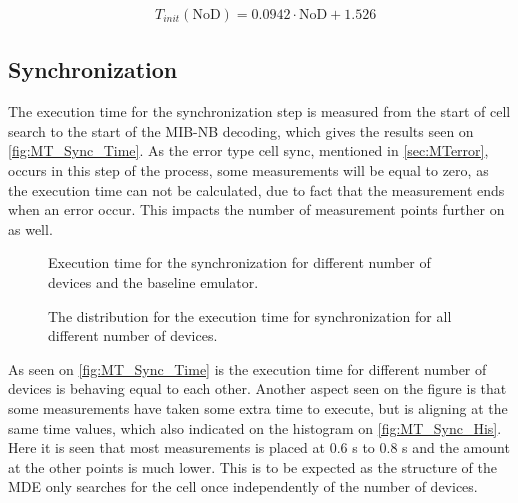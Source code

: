 \begin{align}
&T_{init} (\text{NoD}) = 0.0942 \cdot \text{NoD} + 1.526 
\end{align}
\begin{where}
\end{where}


\subsection{Synchronization}
The execution time for the synchronization step is measured from the start of cell search to the start of the MIB-NB decoding, which gives the results seen on \autoref{fig:MT_Sync_Time}. As the error type cell sync, mentioned in \autoref{sec:MTerror}, occurs in this step of the process, some measurements will be equal to zero, as the execution time can not be calculated, due to fact that the measurement ends when an error occur. This impacts the number of measurement points further on as well.

\captionsetup{belowskip=0em}
\begin{minipage}{0.48\textwidth}
\begin{figure}[H]
\centering
\resizebox{\textwidth}{!}{
}
\caption{Execution time for the synchronization for different number of devices and the baseline emulator.}
\label{fig:MT_Sync_Time}
\end{figure}
\end{minipage}%
\hfill
\begin{minipage}{0.48\textwidth}
\begin{figure}[H]
\centering
\resizebox{\textwidth}{!}{
}
\caption{The distribution for the execution time for synchronization for all different number of devices.}
\label{fig:MT_Sync_His}
\end{figure}
\end{minipage}
\captionsetup{belowskip=-1.5em}

As seen on \autoref{fig:MT_Sync_Time} is the execution time for different number of devices is behaving equal to each other. Another aspect seen on the figure is that some measurements have taken some extra time to execute, but is aligning at the same time values, which also indicated on the histogram on \autoref{fig:MT_Sync_His}. Here it is seen that most measurements is placed at 0.6 s to 0.8 s and the amount at the other points is much lower. This is to be expected as the structure of the MDE only searches for the cell once independently of the number of devices.



